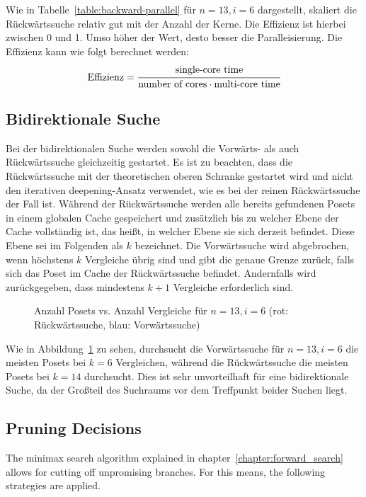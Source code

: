 \documentclass[10pt,journal,compsoc]{IEEEtran}
\begin{document}
Wie in Tabelle~\ref{table:backward-parallel} für $n = 13, i = 6$ dargestellt, skaliert die Rückwärtssuche relativ gut mit der Anzahl der Kerne.
Die Effizienz ist hierbei zwischen 0 und 1.
Umso höher der Wert, desto besser die Paralleisierung.
Die Effizienz kann wie folgt berechnet werden:
\[
  \text{Effizienz} = \cfrac{\text{single-core time}}{\text{number of cores} \cdot \text{multi-core time}}
\]

\subsection{Bidirektionale Suche} \label{sec:bidirectional}

Bei der bidirektionalen Suche werden sowohl die Vorwärts- als auch Rückwärtssuche gleichzeitig gestartet.
Es ist zu beachten, dass die Rückwärtssuche mit der theoretischen oberen Schranke gestartet wird und nicht den iterativen deepening-Ansatz verwendet, wie es bei der reinen Rückwärtssuche der Fall ist.
Während der Rückwärtssuche werden alle bereits gefundenen Posets in einem globalen Cache gespeichert und zusätzlich bis zu welcher Ebene der Cache vollständig ist, das heißt, in welcher Ebene sie sich derzeit befindet.
Diese Ebene sei im Folgenden als $k$ bezeichnet.
Die Vorwärtssuche wird abgebrochen, wenn höchstens $k$ Vergleiche übrig sind und gibt die genaue Grenze zurück, falls sich das Poset im Cache der Rückwärtssuche befindet.
Andernfalls wird zurückgegeben, dass mindestens $k + 1$ Vergleiche erforderlich sind.

\begin{figure}[h!]
  
  \centering
  \caption{Anzahl Posets vs. Anzahl Vergleiche für $n=13, i=6$ (rot: Rückwärtssuche, blau: Vorwärtssuche)}
  \label{fig:backward_forward_count_13_6}
\end{figure}

Wie in Abbildung~\ref{fig:backward_forward_count_13_6} zu sehen, durchsucht die Vorwärtssuche für $n = 13, i = 6$ die meisten Posets bei $k = 6$ Vergleichen, während die Rückwärtssuche die meisten Posets bei $k = 14$ durchsucht.
Dies ist sehr unvorteilhaft für eine bidirektionale Suche, da der Großteil des Suchraums vor dem Treffpunkt beider Suchen liegt.



\subsection{Pruning Decisions}
The minimax search algorithm explained in chapter~\ref{chapter:forward_search} allows for cutting off unpromising branches. For this means, the following strategies are applied.
\end{document}
